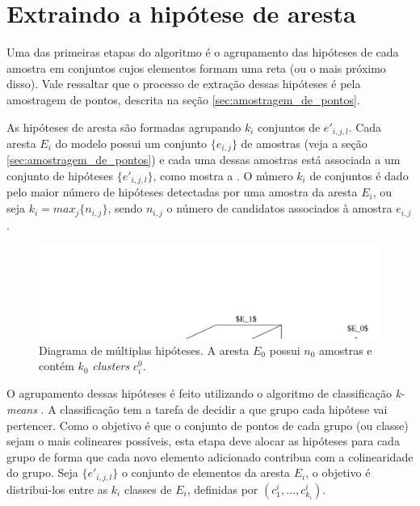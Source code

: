 \section{Extraindo a hipótese de aresta}

Uma das primeiras etapas do algoritmo é o agrupamento das hipóteses de cada amostra em conjuntos cujos elementos formam uma reta (ou o mais próximo disso). Vale ressaltar que o processo de extração dessas hipóteses é pela amostragem de pontos, descrita na seção \ref{sec:amostragem_de_pontos}.

As hipóteses de aresta são formadas agrupando $k_i$ conjuntos de $e'_{i,j,l}$. Cada aresta $E_i$ do modelo possui um conjunto $\{e_{i,j}\}$ de amostras (veja a seção \ref{sec:amostragem_de_pontos}) e cada uma dessas amostras está associada a um conjunto de hipóteses $\{e'_{i,j,l}\}$, como mostra a . O número $k_i$ de conjuntos é dado pelo maior número de hipóteses detectadas por uma amostra da aresta $E_i$, ou seja $k_i = max_j\{n_{i,j}\}$, sendo $n_{i,j}$ o número de candidatos associados à amostra $e_{i,j}$.

\begin{figure}[!ht]
\centering\includegraphics[width=\textwidth]{monografia/multiple_hipotheses_diagram}
\caption{Diagrama de múltiplas hipóteses. A aresta $E_0$ possui $n_0$ amostras e contém $k_0$ \emph{clusters} $c^0_i$.}
\label{multiple_hipotheses_diagram}
\end{figure}

O agrupamento dessas hipóteses é feito utilizando o algoritmo de classificação \emph{k-means} \cite{kmeans}. A classificação tem a tarefa de decidir a que grupo cada hipótese vai pertencer. Como o objetivo é que o conjunto de pontos de cada grupo (ou classe) sejam o mais colineares possíveis, esta etapa deve alocar as hipóteses para cada grupo de forma que cada novo elemento adicionado contribua com a colinearidade do grupo. Seja $\{e'_{i,j,l}\}$ o conjunto de elementos da aresta $E_i$, o objetivo é distribui-los entre as $k_i$ classes de $E_i$, definidas por $(c^i_1, \dots, c^i_{k_i})$.


